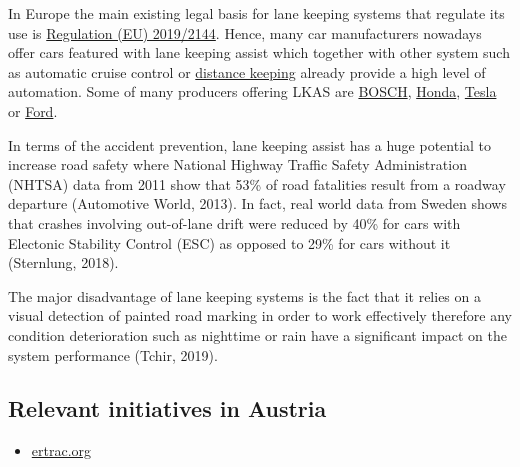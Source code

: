 \documentclass[
]{book}
\providecommand{\tightlist}{%
  \setlength{\itemsep}{0pt}\setlength{\parskip}{0pt}}
\begin{document}
In Europe the main existing legal basis for lane keeping systems that regulate its use is \href{https://op.europa.eu/en/publication-detail/-/publication/bfd5eba8-2058-11ea-95ab-01aa75ed71a1/language-en}{Regulation (EU) 2019/2144}. Hence, many car manufacturers nowadays offer cars featured with lane keeping assist which together with other system such as automatic cruise control or \protect\hyperlink{distance_keeping}{distance keeping} already provide a high level of automation. Some of many producers offering LKAS are \href{https://www.bosch-mobility-solutions.com/en/products-and-services/passenger-cars-and-light-commercial-vehicles/driver-assistance-systems/lane-keeping-assist/}{BOSCH}, \href{https://www.hondainfocenter.com/2021/CR-V/Feature-Guide/Interior-Features/Lane-Keeping-Assist-System-LKAS/}{Honda}, \href{https://www.tesla.com/de_DE/blog/more-advanced-safety-tesla-owners?redirect=no}{Tesla} or \href{https://owner.ford.com/support/how-tos/safety/driver-assist-technology/driving/how-to-use-lane-keeping-system.html}{Ford}.

In terms of the accident prevention, lane keeping assist has a huge potential to increase road safety where National Highway Traffic Safety Administration (NHTSA) data from 2011 show that 53\% of road fatalities result from a roadway departure (Automotive World, 2013). In fact, real world data from Sweden shows that crashes involving out-of-lane drift were reduced by 40\% for cars with Electonic Stability Control (ESC) as opposed to 29\% for cars without it (Sternlung, 2018).

The major disadvantage of lane keeping systems is the fact that it relies on a visual detection of painted road marking in order to work effectively therefore any condition deterioration such as nighttime or rain have a significant impact on the system performance (Tchir, 2019).

\hypertarget{relevant-initiatives-in-austria-25}{%
\subsection*{Relevant initiatives in Austria}\label{relevant-initiatives-in-austria-25}}

\begin{itemize}
\tightlist
\item
  \href{https://www.ertrac.org/uploads/images/ERTRAC2019-Connected-Automated-Driving-Roadmap\%20-2019-04-04.pdf}{ertrac.org}
\end{itemize}
\end{document}
